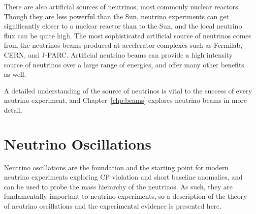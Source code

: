 There are also artificial sources of neutrinos, most commonly nuclear reactors.  Though they are less powerful than the Sun, neutrino experiments can get significantly closer to a nuclear reactor than to the Sun, and the local neutrino flux can be quite high.  The most sophisticated artificial source of neutrinos comes from the neutrinos beams produced at accelerator complexes such as Fermilab, CERN, and J-PARC.  Artificial neutrino beams can provide a high intensity source of neutrinos over a large range of energies, and offer many other benefits as well.  

A detailed understanding of the source of neutrinos is vital to the success of every neutrino experiment, and Chapter~\ref{chp:beams} explores neutrino beams in more detail.







\section{Neutrino Oscillations}

Neutrino oscillations \cite{Bilenky:1978nj, Maki:1962mu, Langacker:1988up} are the foundation and the starting point for modern neutrino experiments exploring CP violation and short baseline anomalies, and can be used to probe the mass hierarchy of the neutrinos.  As such, they are fundamentally important to neutrino experiments, so a description of the theory of neutrino oscillations and the experimental evidence is presented here.

